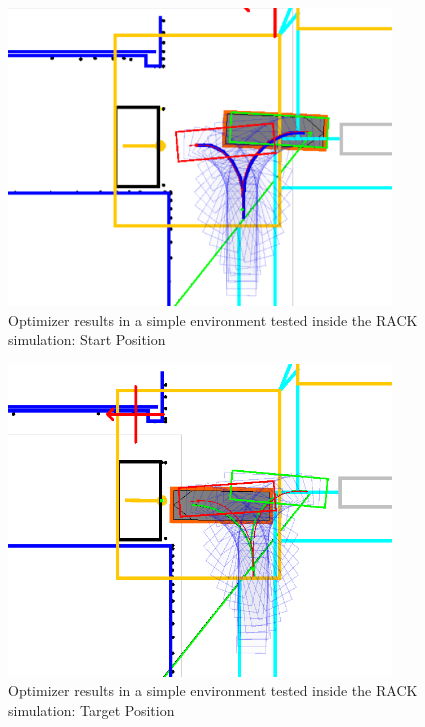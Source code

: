 \begin{figure}[H]
    \begin{center}
        \includegraphics[width=4in]{images/Chap3/Start.png} %
        \caption{Optimizer results in a simple environment tested inside the RACK simulation: Start Position}
        \label{OptResult4}
        \end{center}    
\end{figure}

\begin{figure}[H]
    \begin{center}
        \includegraphics[width=4in]{images/Chap3/Target.png} %
        \caption{Optimizer results in a simple environment tested inside the RACK simulation: Target Position}
        \label{OptResult5}
        \end{center}    
\end{figure}

